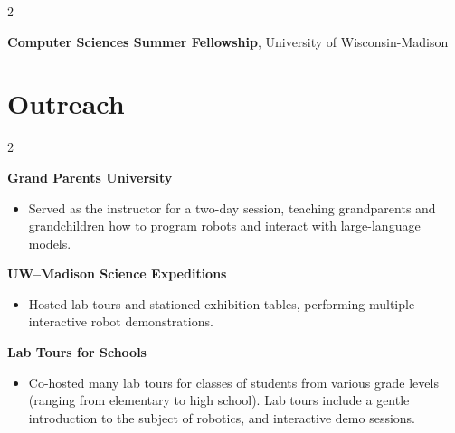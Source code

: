 \documentclass[10pt, letterpaper]{article}
\newenvironment{highlights}{
    \begin{itemize}[
        topsep=0.10 cm,
        parsep=0.10 cm,
        partopsep=0pt,
        itemsep=0pt,
        leftmargin=0.4 cm + 10pt
    ]
}{
    \end{itemize}
} %
\newenvironment{twocolentry}[2][]{
    \onecolentry
    \def\secondColumn{#2}
    \setcolumnwidth{\fill, 4.5 cm}
    \begin{paracol}{2}
}{
    \switchcolumn \raggedleft \secondColumn
    \end{paracol}
    \endonecolentry
} %
\begin{document}
        \begin{twocolentry} {2024}
            
             \textbf{Computer Sciences Summer Fellowship}, University of Wisconsin-Madison
            
        \end{twocolentry}



    
    \section{Outreach}
        \begin{twocolentry} {2025}
            
             \textbf{Grand Parents University}
            \begin{highlights}
                \item Served as the instructor for a two-day session, teaching grandparents and grandchildren how to program robots and interact with large-language models.
            \end{highlights}

            \vspace{0.10cm}

            \textbf{UW--Madison Science Expeditions}
            \begin{highlights}
                \item Hosted lab tours and stationed exhibition tables, performing multiple interactive robot demonstrations.
            \end{highlights}

            \vspace{0.10cm}

            \textbf{Lab Tours for Schools}
            \begin{highlights}
                \item Co-hosted many lab tours for classes of students from various grade levels (ranging from elementary to high school). Lab tours include a gentle introduction to the subject of robotics, and interactive demo sessions.
            \end{highlights}

            
        \end{twocolentry}
\end{document}
